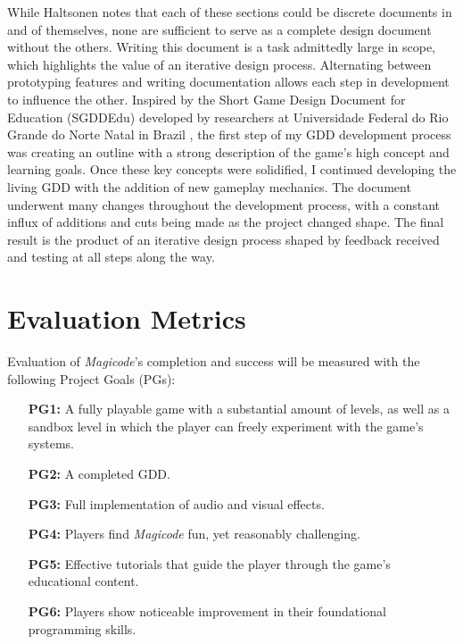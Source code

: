 \documentclass[10pt,twocolumn]{article}
\begin{document}
While Haltsonen notes that each of these sections could be discrete documents in and of themselves, none are sufficient to serve as a complete design document without the others. Writing this document is a task admittedly large in scope, which highlights the value of an iterative design process. Alternating between prototyping features and writing documentation allows each step in development to influence the other. Inspired by the Short Game Design Document for Education (SGDDEdu) developed by researchers at Universidade Federal do Rio Grande do Norte Natal in Brazil \cite{gdd-ed-game}, the first step of my GDD development process was creating an outline with a strong description of the game’s high concept and learning goals. Once these key concepts were solidified, I continued developing the living GDD with the addition of new gameplay mechanics. The document underwent many changes throughout the development process, with a constant influx of additions and cuts being made as the project changed shape. The final result is the product of an iterative design process shaped by feedback received and testing at all steps along the way.





\section{Evaluation Metrics}

Evaluation of \textit{Magicode}’s completion and success will be measured with the following Project Goals (PGs):

\begin{itemize}[leftmargin=.5in]
    \item[\textbf{PG1:}] A fully playable game with a substantial amount of levels, as well as a sandbox level in which the player can freely experiment with the game’s systems.
    \item[\textbf{PG2:}] A completed GDD.
    \item[\textbf{PG3:}] Full implementation of audio and visual effects.
    \item[\textbf{PG4:}] Players find \textit{Magicode} fun, yet reasonably challenging.
    \item[\textbf{PG5:}] Effective tutorials that guide the player through the game’s educational content.
    \item[\textbf{PG6:}] Players show noticeable improvement in their foundational programming skills.
\end{itemize}
\end{document}

